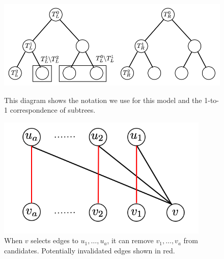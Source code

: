 \begin{figure}[b]
\vspace{-0.2in}
\centering
\begin{minipage}{0.45\textwidth}
\centering
\includegraphics[width=1.1\textwidth]{images/hierarchy_tree.png}
\caption{This diagram shows the notation we use for this model and the 1-to-1 correspondence of subtrees.}\label{fig:hierarchy}
\end{minipage}
\hspace{0cm}
\begin{minipage}{0.45\textwidth}
\centering
\includegraphics[width=0.9\textwidth]{images/greedy.png}


\vspace{-0.3in}
\caption{When $v$ selects edges to $u_1,\ldots, u_a$, it can remove $v_1,\ldots, v_a$ from candidates. Potentially invalidated edges shown in red.}

\label{fig:greedy}
\end{minipage}
\end{figure}

